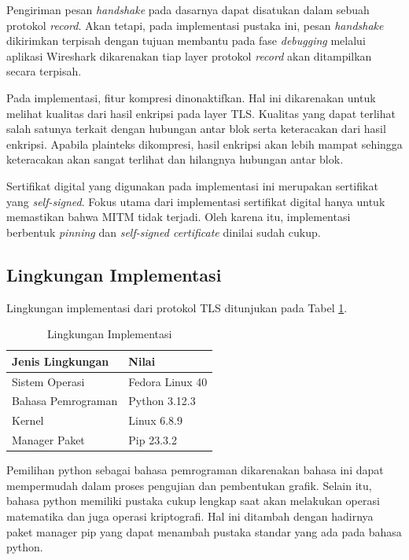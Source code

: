 Pengiriman pesan \emph{handshake} pada dasarnya dapat disatukan dalam sebuah protokol \emph{record}. Akan tetapi, pada implementasi pustaka ini, pesan \emph{handshake} dikirimkan terpisah dengan tujuan  membantu pada fase \emph{debugging} melalui aplikasi Wireshark dikarenakan tiap layer protokol \emph{record} akan ditampilkan secara terpisah.

Pada implementasi, fitur kompresi dinonaktifkan. Hal ini dikarenakan untuk melihat kualitas dari hasil enkripsi pada layer TLS. Kualitas yang dapat terlihat salah satunya terkait dengan hubungan antar blok serta keteracakan dari hasil enkripsi. Apabila plainteks dikompresi, hasil enkripsi akan lebih mampat sehingga keteracakan akan sangat terlihat dan hilangnya hubungan antar blok.

Sertifikat digital yang digunakan pada implementasi ini merupakan sertifikat yang \emph{self-signed}. Fokus utama dari implementasi sertifikat digital hanya untuk memastikan bahwa MITM tidak terjadi. Oleh karena itu, implementasi berbentuk \emph{pinning} dan \emph{self-signed certificate} dinilai sudah cukup.

\subsection{Lingkungan Implementasi}

Lingkungan implementasi dari protokol TLS ditunjukan pada Tabel \ref{tab:impl.env}.

\begin{table}[!h]
  \centering
  \caption{Lingkungan Implementasi} \label{tab:impl.env}
  \begin{tabular}{|p{3cm}|p{6cm}|}
    \hline
    \textbf{Jenis Lingkungan} & \textbf{Nilai} \\ \hline
    Sistem Operasi & Fedora Linux 40 \\ \hline
    Bahasa Pemrograman & Python 3.12.3 \\ \hline
    Kernel & Linux 6.8.9 \\ \hline
    Manager Paket & Pip 23.3.2 \\ \hline
  \end{tabular}
\end{table}

Pemilihan python sebagai bahasa pemrograman dikarenakan bahasa ini dapat mempermudah dalam proses pengujian dan pembentukan grafik. Selain itu, bahasa python memiliki pustaka cukup lengkap saat akan melakukan operasi matematika dan juga operasi kriptografi. Hal ini ditambah dengan hadirnya paket manager pip yang dapat menambah pustaka standar yang ada pada bahasa python.

